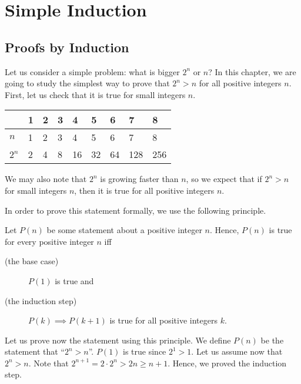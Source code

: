 \chapter{Simple Induction}
\label{chapter:simple-induction}
\section{Proofs by Induction}

Let us consider a simple problem: what is bigger $2^n$ or $n$? In this chapter,
we are going to study the simplest way to prove that $2^n > n$ for all positive
integers $n$. First, let us check that it is true for small integers $n$.
\begin{center}
  \begin{tabular}{l l l  l  l  l  l  l  l}
    \toprule
          & 1 & 2 & 3 & 4  & 5  & 6  & 7   & 8   \\
    \midrule
    $n$   & 1 & 2 & 3 & 4  & 5  & 6  & 7   & 8   \\
    $2^n$ & 2 & 4 & 8 & 16 & 32 & 64 & 128 & 256 \\
    \bottomrule
  \end{tabular}
\end{center}
We may also note that $2^n$ is growing faster than $n$, so we expect that if
$2^n > n$ for small integers $n$, then it is true for all positive integers $n$.

In order to prove this statement formally, we use the following principle.
\begin{principle}
  Let $P(n)$ be some statement about a positive integer $n$.
  Hence, $P(n)$ is true for every positive integer $n$ iff
  \begin{description}
    \item [(the base case)] $P(1)$ is true and
    \item [(the induction step)] $P(k) \implies P(k + 1)$ is true
      for all positive integers $k$.
  \end{description}
\end{principle}

Let us prove now the statement using this principle.
We define $P(n)$ be the statement that ``$2^n > n$''.
$P(1)$ is true since $2^1 > 1$. Let us assume now that $2^n > n$. Note that
$2^{n + 1} = 2 \cdot 2^n > 2n \ge n + 1$. Hence, we proved the induction step.

